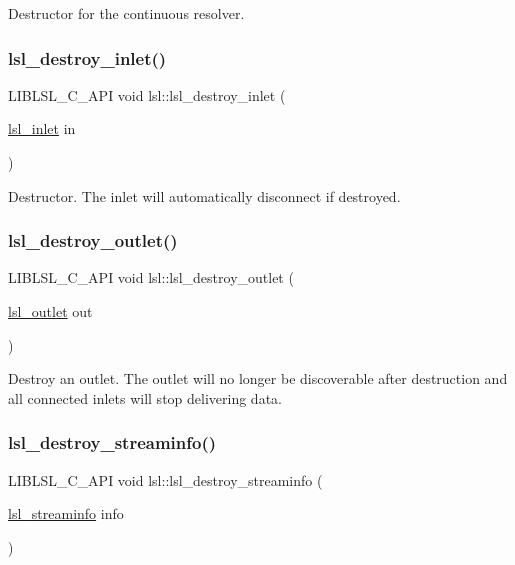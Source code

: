 Destructor for the continuous resolver. \mbox{\label{namespacelsl_a079daffcce73f1ed31bd52d681019029}} 
\subsubsection{\texorpdfstring{lsl\+\_\+destroy\+\_\+inlet()}{lsl\_destroy\_inlet()}}
{\footnotesize\ttfamily L\+I\+B\+L\+S\+L\+\_\+\+C\+\_\+\+A\+PI void lsl\+::lsl\+\_\+destroy\+\_\+inlet (\begin{DoxyParamCaption}\item[{\hyperlink{namespacelsl_a884a3363cfcba75d7ce8f00c1c4c54f1}{lsl\+\_\+inlet}}]{in }\end{DoxyParamCaption})}

Destructor. The inlet will automatically disconnect if destroyed. \mbox{\label{namespacelsl_aa39980eac53711feece8bfc3b50d2b24}} 
\subsubsection{\texorpdfstring{lsl\+\_\+destroy\+\_\+outlet()}{lsl\_destroy\_outlet()}}
{\footnotesize\ttfamily L\+I\+B\+L\+S\+L\+\_\+\+C\+\_\+\+A\+PI void lsl\+::lsl\+\_\+destroy\+\_\+outlet (\begin{DoxyParamCaption}\item[{\hyperlink{namespacelsl_abcf512b0f66dacf86c10b165995fd50b}{lsl\+\_\+outlet}}]{out }\end{DoxyParamCaption})}

Destroy an outlet. The outlet will no longer be discoverable after destruction and all connected inlets will stop delivering data. \mbox{\label{namespacelsl_afc7ae71903a0c20763937739fa62df32}} 
\subsubsection{\texorpdfstring{lsl\+\_\+destroy\+\_\+streaminfo()}{lsl\_destroy\_streaminfo()}}
{\footnotesize\ttfamily L\+I\+B\+L\+S\+L\+\_\+\+C\+\_\+\+A\+PI void lsl\+::lsl\+\_\+destroy\+\_\+streaminfo (\begin{DoxyParamCaption}\item[{\hyperlink{namespacelsl_aa0a9ce9956061679949daa2e35aae2e8}{lsl\+\_\+streaminfo}}]{info }\end{DoxyParamCaption})}

